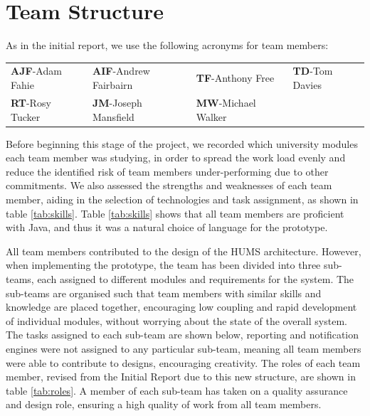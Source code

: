 \section{Team Structure}
\label{sec:team}

As in the initial report, we use the following acronyms for team members:

\begin{tabular}{ p{3cm} p{4cm} p{3.5cm} p{3.5cm} }
  \textbf{AJF}-Adam Fahie &
  \textbf{AIF}-Andrew Fairbairn &
  \textbf{TF}-Anthony Free &
  \textbf{TD}-Tom Davies \\
    \textbf{RT}-Rosy Tucker &
  \textbf{JM}-Joseph Mansfield &
  \textbf{MW}-Michael Walker \\
\end{tabular}

Before beginning this stage of the project, we recorded which university 
modules each team member was studying, in order to spread the work load evenly and reduce the identified risk of team members under-performing due to other commitments. We also assessed the strengths and weaknesses of each team member, aiding in the selection of technologies and task assignment, as shown in table \ref{tab:skills}. Table \ref{tab:skills} shows that all team members are proficient with Java, and thus it was a natural choice of language for the prototype.

All team members contributed to the design of the HUMS architecture. 
However, when implementing the prototype, the team has been divided into three sub-teams, each assigned to different modules and requirements for the system. The sub-teams are organised such that team members with similar skills and  knowledge are placed together, encouraging low coupling and rapid development of individual modules, without worrying about the state of the overall system. The tasks assigned to each sub-team are shown below, reporting and notification engines were not assigned to any particular sub-team, meaning all team members were able to contribute to designs, 
encouraging creativity. The roles of each team member, revised from the Initial Report due to this new structure, are shown in table \ref{tab:roles}. A member of each sub-team has taken on a quality assurance and design role, ensuring a high quality of work from all team members.

